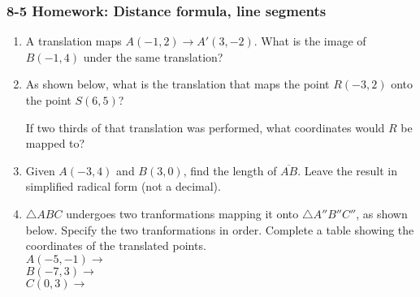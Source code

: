 \documentclass[12pt, twoside]{article}
\begin{document}
\subsubsection*{8-5 Homework: Distance formula, line segments}
 \begin{enumerate}

  \item A translation maps $A(-1,2) \rightarrow A'(3,-2)$. What is the image of $B(-1,4)$ under the same translation?  \vspace{3cm}

  \item As shown below, what is the translation that maps the point $R(-3,2)$ onto the point $S(6, 5)$?
    \begin{center} %
    \end{center}
    If two thirds of that translation was performed, what coordinates would $R$ be mapped to? \vspace{2cm}

  \item Given $A(-3,4)$ and $B(3,0)$, find the length of $\overline{AB}$. Leave the result in simplified radical form (not a decimal).
      \vspace{4cm}

\newpage

  \item $\triangle ABC$ undergoes two tranformations mapping it onto $\triangle A''B''C''$, as shown below. Specify the two tranformations in order. Complete a table showing the coordinates of the translated points.\\[2cm]
   \hspace{1cm} $A(-5,-1) \rightarrow$\\[1cm]
   \hspace{1cm} $B(-7,3) \rightarrow$\\[1cm]
   \hspace{1cm} $C(0,3) \rightarrow$

    \vspace{0.5cm}


\end{enumerate}
\end{document}
